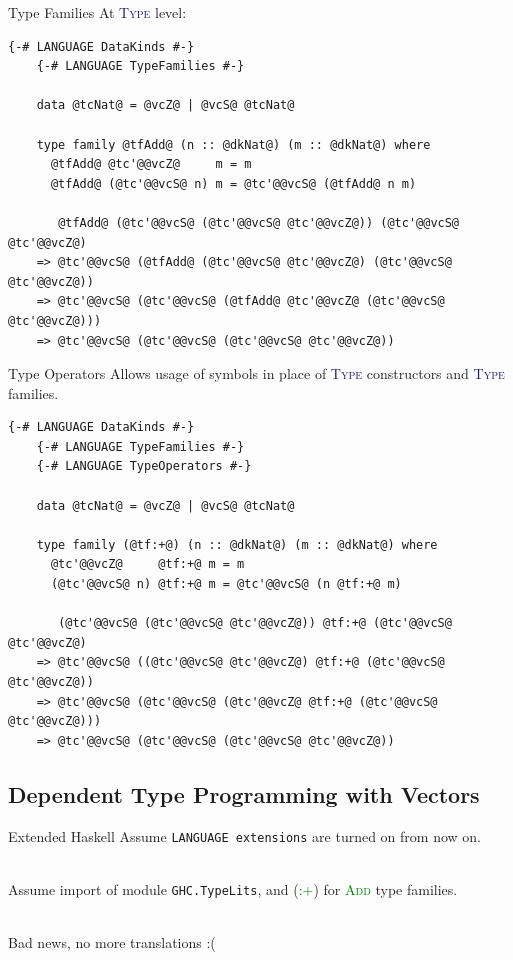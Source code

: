 \documentclass[xcolor={usenames,dvipsnames}]{beamer}
\newcommand{\htycon}[1]{\textcolor{MidnightBlue}{\textsc{#1}}}
\newcommand{\htyfam}[1]{\textcolor{Green}{\textsc{#1}}}
\begin{document}
\begin{frame}[fragile]{Type Families}
  At \htycon{Type} level:
  \begin{lstlisting}[style=hask]
    {-# LANGUAGE DataKinds #-}
    {-# LANGUAGE TypeFamilies #-}

    data @tcNat@ = @vcZ@ | @vcS@ @tcNat@

    type family @tfAdd@ (n :: @dkNat@) (m :: @dkNat@) where
      @tfAdd@ @tc'@@vcZ@     m = m
      @tfAdd@ (@tc'@@vcS@ n) m = @tc'@@vcS@ (@tfAdd@ n m)

       @tfAdd@ (@tc'@@vcS@ (@tc'@@vcS@ @tc'@@vcZ@)) (@tc'@@vcS@ @tc'@@vcZ@)
    => @tc'@@vcS@ (@tfAdd@ (@tc'@@vcS@ @tc'@@vcZ@) (@tc'@@vcS@ @tc'@@vcZ@))
    => @tc'@@vcS@ (@tc'@@vcS@ (@tfAdd@ @tc'@@vcZ@ (@tc'@@vcS@ @tc'@@vcZ@)))
    => @tc'@@vcS@ (@tc'@@vcS@ (@tc'@@vcS@ @tc'@@vcZ@))
  \end{lstlisting}
\end{frame}

\begin{frame}[fragile]{Type Operators}
  Allows usage of symbols in place of \htycon{Type} constructors and \htycon{Type} families.

  \begin{lstlisting}[style=hask]
    {-# LANGUAGE DataKinds #-}
    {-# LANGUAGE TypeFamilies #-}
    {-# LANGUAGE TypeOperators #-}

    data @tcNat@ = @vcZ@ | @vcS@ @tcNat@

    type family (@tf:+@) (n :: @dkNat@) (m :: @dkNat@) where
      @tc'@@vcZ@     @tf:+@ m = m
      (@tc'@@vcS@ n) @tf:+@ m = @tc'@@vcS@ (n @tf:+@ m)

       (@tc'@@vcS@ (@tc'@@vcS@ @tc'@@vcZ@)) @tf:+@ (@tc'@@vcS@ @tc'@@vcZ@)
    => @tc'@@vcS@ ((@tc'@@vcS@ @tc'@@vcZ@) @tf:+@ (@tc'@@vcS@ @tc'@@vcZ@))
    => @tc'@@vcS@ (@tc'@@vcS@ (@tc'@@vcZ@ @tf:+@ (@tc'@@vcS@ @tc'@@vcZ@)))
    => @tc'@@vcS@ (@tc'@@vcS@ (@tc'@@vcS@ @tc'@@vcZ@))
  \end{lstlisting}
\end{frame}


\subsection{Dependent Type Programming with Vectors}

\begin{frame}[fragile]{Extended Haskell}
  Assume \texttt{LANGUAGE extensions} are turned on from now on.
  
  \ \\
  \pause
  Assume import of module \texttt{GHC.TypeLits}, and (\htyfam{:+}) for \htyfam{Add} type families.

  \ \\
  \pause
  Bad news, no more translations :(
\end{frame}
\end{document}
